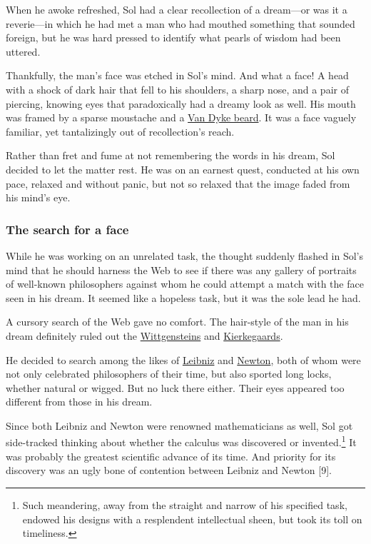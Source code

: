 \documentclass[
  11pt,
  british,
  a4paper,
]{article}
\begin{document}
When he awoke refreshed, Sol had a clear recollection of a dream---or
was it a reverie---in which he had met a man who had mouthed something
that sounded foreign, but he was hard pressed to identify what pearls of
wisdom had been uttered.

Thankfully, the man's face was etched in Sol's mind. And what a face! A
head with a shock of dark hair that fell to his shoulders, a sharp nose,
and a pair of piercing, knowing eyes that paradoxically had a dreamy
look as well. His mouth was framed by a sparse moustache and a
\href{https://en.wikipedia.org/wiki/Van_Dyke_beard}{Van Dyke beard}. It
was a face vaguely familiar, yet tantalizingly out of recollection's
reach.

Rather than fret and fume at not remembering the words in his dream, Sol
decided to let the matter rest. He was on an earnest quest, conducted at
his own pace, relaxed and without panic, but not so relaxed that the
image faded from his mind's eye. \emojifont🙂\normalfont

\hypertarget{the-search-for-a-face}{%
\subsubsection{The search for a face}\label{the-search-for-a-face}}

While he was working on an unrelated task, the thought suddenly flashed
in Sol's mind that he should harness the Web to see if there was any
gallery of portraits of well-known philosophers against whom he could
attempt a match with the face seen in his dream. It seemed like a
hopeless task, but it was the sole lead he had.

A cursory search of the Web gave no comfort. The hair-style of the man
in his dream definitely ruled out the
\href{https://tinyurl.com/y2sn8uzb}{Wittgensteins} and
\href{https://tinyurl.com/y3xdx3gl}{Kierkegaards}.

He decided to search among the likes of
\href{https://tinyurl.com/yxomtbt5}{Leibniz} and
\href{https://tinyurl.com/y5lc2fyx}{Newton}, both of whom were not only
celebrated philosophers of their time, but also sported long locks,
whether natural or wigged. But no luck there either. Their eyes appeared
too different from those in his dream.

Since both Leibniz and Newton were renowned mathematicians as well, Sol
got side-tracked thinking about whether the calculus was discovered or
invented.\footnote{Such meandering, away from the straight and narrow of
  his specified task, endowed his designs with a resplendent
  intellectual sheen, but took its toll on timeliness.} It was probably
the greatest scientific advance of its time. And priority for its
discovery was an ugly bone of contention between Leibniz and Newton
{[}9{]}.
\end{document}

